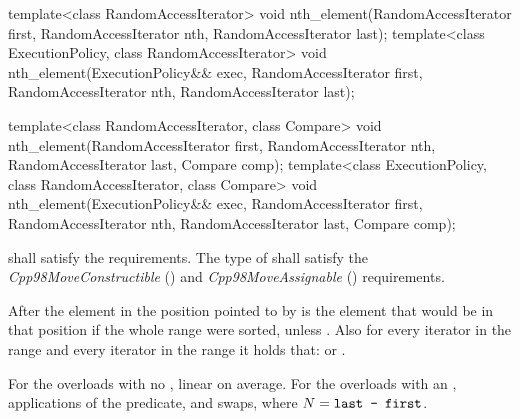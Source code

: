 %
\begin{itemdecl}
template<class RandomAccessIterator>
  void nth_element(RandomAccessIterator first, RandomAccessIterator nth,
                   RandomAccessIterator last);
template<class ExecutionPolicy, class RandomAccessIterator>
  void nth_element(ExecutionPolicy&& exec,
                   RandomAccessIterator first, RandomAccessIterator nth,
                   RandomAccessIterator last);

template<class RandomAccessIterator, class Compare>
  void nth_element(RandomAccessIterator first, RandomAccessIterator nth,
                   RandomAccessIterator last,  Compare comp);
template<class ExecutionPolicy, class RandomAccessIterator, class Compare>
  void nth_element(ExecutionPolicy&& exec,
                   RandomAccessIterator first, RandomAccessIterator nth,
                   RandomAccessIterator last, Compare comp);
\end{itemdecl}

\begin{itemdescr}
\pnum
\requires
{} shall satisfy the
 requirements. The type
of  shall satisfy the
\textit{Cpp98MoveConstructible} () and
\textit{Cpp98MoveAssignable} () requirements.

\pnum
\effects
After
the element in the position pointed to by 
is the element that would be
in that position if the whole range were sorted, unless .
Also for every iterator
in the range
and every iterator
in the range
it holds that:
or
.

\pnum
\complexity
For the overloads with no , linear on average.
For the overloads with an ,  applications of
the predicate, and  swaps, where $N = \texttt{last - first}$.
\end{itemdescr}

